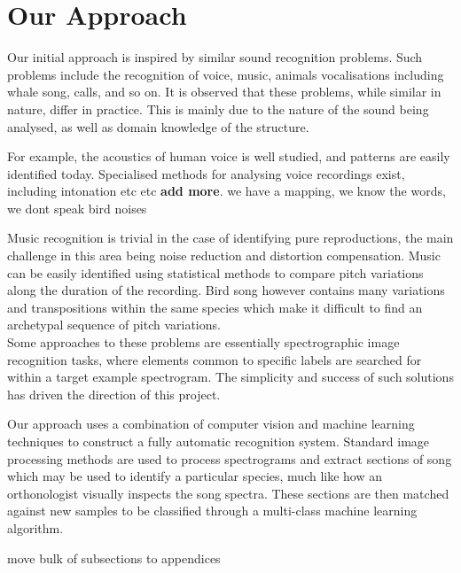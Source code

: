 \section{Our Approach}
Our initial approach is inspired by similar sound recognition problems.
Such problems include the recognition of voice, music, animals vocalisations
including whale song, calls, and so on.
It is observed that these problems, while similar in nature, differ in practice.
This is mainly due to the nature of the sound being analysed, as well as
domain knowledge of the structure.

For example, the acoustics of human voice is well studied, and patterns are
easily identified today.
Specialised methods for analysing voice recordings exist, including intonation
etc etc \textbf{add more}.
we have a mapping, we know the words, we dont speak bird noises

Music recognition is trivial in the case of identifying pure reproductions,
the main challenge in this area being noise reduction and distortion compensation.
Music can be easily identified using statistical methods to compare pitch
variations along the duration of the recording.
Bird song however contains many variations and transpositions within the same
species which make it difficult to find an archetypal sequence of pitch
variations.\\

Some approaches to these problems are essentially spectrographic image recognition
tasks, where elements common to specific labels are searched for within a target
example spectrogram.
The simplicity and success of such solutions has driven the direction of this
project.

Our approach uses a combination of computer vision and machine learning
techniques to construct a fully automatic recognition system.
Standard image processing methods are used to process spectrograms and extract
sections of song which may be used to identify a particular species, much like
how an orthonologist visually inspects the song spectra.
These sections are then matched against new samples to be classified through a
multi-class machine learning algorithm.

move bulk of subsections to appendices

